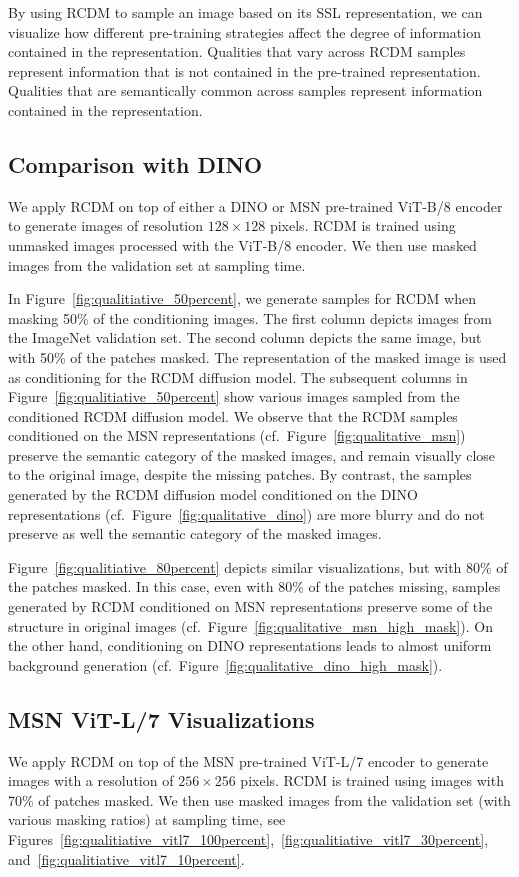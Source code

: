 \documentclass{article}
\begin{document}
By using RCDM to sample an image based on its SSL representation, we can visualize how different pre-training strategies affect the degree of information contained in the representation.
Qualities that vary across RCDM samples represent information that is not contained in the pre-trained representation. Qualities that are semantically common across samples represent information contained in the representation.

\subsection{Comparison with DINO}
We apply RCDM on top of either a DINO or MSN pre-trained ViT-B/8 encoder to generate images of resolution $128\times 128$ pixels. RCDM is trained using unmasked images processed with the ViT-B/8 encoder. We then use masked images from the validation set at sampling time.

In Figure~\ref{fig:qualitiative_50percent}, we generate samples for RCDM when masking 50\% of the conditioning images.
The first column depicts images from the ImageNet validation set. 
The second column depicts the same image, but with 50\% of the patches masked. The representation of the masked image is used as conditioning for the RCDM diffusion model.
The subsequent columns in Figure~\ref{fig:qualitiative_50percent} show various images sampled from the conditioned RCDM diffusion model.  
We observe that the RCDM samples conditioned on the MSN representations (cf.~Figure~\ref{fig:qualitative_msn}) preserve the semantic category of the masked images, and remain visually close to the original image, despite the missing patches.
By contrast, the samples generated by the RCDM diffusion model conditioned on the DINO representations (cf.~Figure~\ref{fig:qualitative_dino}) are more blurry and do not preserve as well the semantic category of the masked images.

Figure~\ref{fig:qualitiative_80percent} depicts similar visualizations, but with 80\% of the patches masked.
In this case, even with 80\% of the patches missing, samples generated by RCDM conditioned on MSN representations preserve some of the structure in original images (cf.~Figure~\ref{fig:qualitative_msn_high_mask}).
On the other hand, conditioning on DINO representations leads to almost uniform background generation (cf.~Figure~\ref{fig:qualitative_dino_high_mask}). 


\subsection{MSN ViT-L/7 Visualizations}
We apply RCDM on top of the MSN pre-trained ViT-L/7 encoder to generate images with a resolution of $256 \times 256$ pixels. RCDM is trained using images with 70\% of patches masked. We then use masked images from the validation set (with various masking ratios) at sampling time, see Figures~\ref{fig:qualitiative_vitl7_100percent},~\ref{fig:qualitiative_vitl7_30percent}, and~\ref{fig:qualitiative_vitl7_10percent}.
\end{document}
